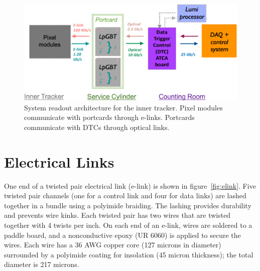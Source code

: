 \documentclass[a4paper,11pt]{article}
\begin{document}
\begin{figure}[htbp]
\centering
\includegraphics[width=1.0\textwidth,origin=c]{../figures/IT_System_Readout.jpg}
\caption{
\label{fig:readout}
System readout architecture for the inner tracker. Pixel modules communicate with portcards through e-links. Portcards communicate with DTCs through optical links.
}
\end{figure}

\section{Electrical Links}
\label{sec:electrical}



%
%
%
%
%

One end of a twisted pair electrical link (e-link) is shown in figure~\ref{fig:elink}.
Five twisted pair channels (one for a control link and four for data links) are lashed together in a bundle using a polyimide braiding.
The lashing provides durability and prevents wire kinks.
Each twisted pair has two wires that are twisted together with 4 twists per inch.
On each end of an e-link, wires are soldered to a paddle board, and a nonconductive epoxy (UR 6060) is applied to secure the wires.
Each wire has a 36 AWG copper core (127 microns in diameter) surrounded by a polyimide coating for insolation (45 micron thickness); the total diameter is 217 microns.
\end{document}
